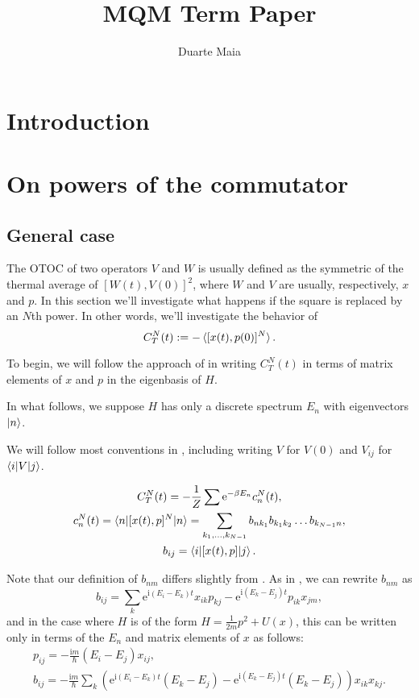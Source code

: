 \documentclass{article}
\title{MQM Term Paper}
\author{Duarte Maia}
\date{}
\newcommand{\e}{\mathrm{e}}
\newcommand{\I}{\mathrm{i}}
\begin{document}
\tableofcontents

\section{Introduction}

\section{On powers of the commutator}

\subsection{General case}

The OTOC of two operators $V$ and $W$ is usually defined as the symmetric of the thermal average of $[W(t), V(0)]^2$, where $W$ and $V$ are usually, respectively, $x$ and $p$. In this section we'll investigate what happens if the square is replaced by an $N$th power. In other words, we'll investigate the behavior of
\[C_T^N(t) := -\braket{[x(t), p(0)]^N}.\]

To begin, we will follow the approach of \cite{Hashimoto_2017} in writing $C_T^N(t)$ in terms of matrix elements of $x$ and $p$ in the eigenbasis of $H$.

In what follows, we suppose $H$ has only a discrete spectrum $E_n$ with eigenvectors $\ket n$.

We will follow most conventions in \cite{Hashimoto_2017}, including writing $V$ for $V(0)$ and $V_{ij}$ for $\braket{i|V|j}$.

\begin{gather}
C_T^N(t) = -\frac1Z \sum \e^{-\beta E_n} c_n^N(t),\\
c_n^N(t) = \braket{n|[x(t), p]^N|n} = \sum_{k_1, \dots, k_{N-1}} b_{nk_1} b_{k_1 k_2} \dots b_{k_{N-1} n}, \label{smallcdef}\\
b_{ij} = \braket{i|[x(t), p]|j}. \label{bdef}
\end{gather}

Note that our definition of $b_{nm}$ differs slightly from \cite{Hashimoto_2017}. As in \cite{Hashimoto_2017}, we can rewrite $b_{nm}$ as
\[b_{ij} = \sum_k \e^{\I (E_i - E_k) t} x_{ik} p_{kj} - \e^{\I (E_k - E_j) t} p_{ik} x_{jm},\]
and in the case where $H$ is of the form $H = \frac1{2m} p^2 + U(x)$, this can be written only in terms of the $E_n$ and matrix elements of $x$ as follows:
\begin{gather}
p_{ij} = - \frac{\I m}{\hbar} (E_i - E_j) x_{ij},\\
b_{ij} = - \frac{\I m}{\hbar} \sum_k \left( \e^{\I (E_i - E_k) t} (E_k - E_j) - \e^{\I (E_k - E_j) t} (E_k - E_j) \right) x_{ik} x_{kj}. \label{bijwithx}
\end{gather}
\end{document}
